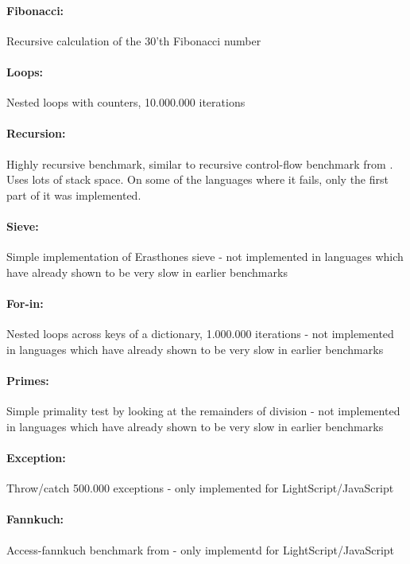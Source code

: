 \paragraph{Fibonacci:} Recursive calculation of the 30'th Fibonacci number
\paragraph{Loops:} Nested loops with counters, 10.000.000 iterations
\paragraph{Recursion:} Highly recursive benchmark, similar to recursive control-flow benchmark from \cite{sunspider, shootout}. Uses lots of stack space. On some of the languages where it fails, only the first part of it was implemented.
\paragraph{Sieve:} Simple implementation of Erasthones sieve - not implemented in languages which have already shown to be very slow in earlier benchmarks
\paragraph{For-in:} Nested loops across keys of a dictionary, 1.000.000 iterations - not implemented in languages which have already shown to be very slow in earlier benchmarks
\paragraph{Primes:} Simple primality test by looking at the remainders of division - not implemented in languages which have already shown to be very slow in earlier benchmarks
\paragraph{Exception:} Throw/catch 500.000 exceptions - only implemented for LightScript/JavaScript
\paragraph{Fannkuch:} Access-fannkuch benchmark from \cite{sunspider, shootout} - only implementd for LightScript/JavaScript

